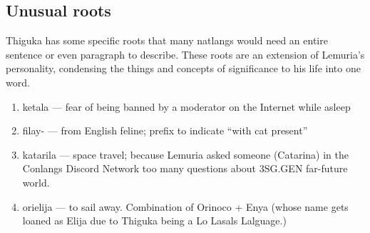 \subsection{Unusual roots}
Thiguka has some specific roots that many natlangs would need an entire sentence or even paragraph to describe.
These roots are an extension of Lemuria's personality, condensing the things and concepts of significance to his life into one word.

\begin{multicols}{2} 
\begin{enumerate}
    \item ketala --- fear of being banned by a moderator on the Internet while asleep
    \item filay- --- from English feline; prefix to indicate ``with cat present''
    \item katarila --- space travel; because Lemuria asked someone (Catarina) in the Conlangs Discord Network too many questions about 3SG.GEN far-future world.
    \item orielija --- to sail away. Combination of Orinoco + Enya (whose name gets loaned as Elija due to Thiguka being a Lo Lasals Lalguage.)
\end{enumerate}
\end{multicols}
